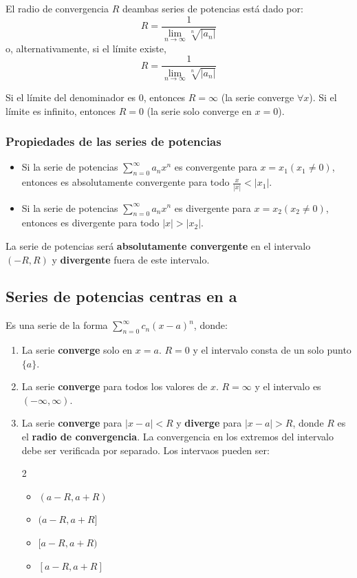 \documentclass[a4paper,12pt]{article}
\begin{document}
El radio de convergencia $R$ deambas series de potencias está dado por:
$$ R = \frac{1}{\lim_{n \to \infty} \sqrt[n]{|a_n|}} $$
o, alternativamente, si el límite existe,
$$ R = \frac{1}{\lim_{n \to \infty} \sqrt[n]{|a_n|}} $$

\begin{tcolorbox}
    Si el límite del denominador es 0, entonces $R = \infty$ (la serie converge $\forall x$). Si el límite es infinito, entonces $R = 0$ (la serie solo converge en $x = 0$).
\end{tcolorbox}

\subsubsection{Propiedades de las series de potencias}
\begin{itemize}
    \item Si la serie de potencias $\sum_{n=0}^{\infty} a_n x^n$ es convergente para $x = x_1 (x_1 \neq 0)$, entonces es absolutamente convergente para todo $\frac{x}{|x|} < |x_1|$.
    \item Si la serie de potencias $\sum_{n=0}^{\infty} a_n x^n$ es divergente para $x = x_2 (x_2 \neq 0)$, entonces es divergente para todo $|x| > |x_2|$.
\end{itemize}

\begin{tcolorbox}
    La serie de potencias será \textbf{absolutamente convergente} en el intervalo $(-R, R)$ y \textbf{divergente} fuera de este intervalo.
\end{tcolorbox}

\subsection{Series de potencias centras en a}

Es una serie de la forma $\sum_{n=0}^{\infty} c_n (x - a)^n$, donde:
\begin{enumerate}
    \item La serie \textbf{converge} solo en $x = a$. $R = 0$ y el intervalo consta de un solo punto $\{a\}$.
    \item La serie \textbf{converge} para todos los valores de $x$. $R = \infty$ y el intervalo es $(-\infty, \infty)$.
    \item La serie \textbf{converge} para $|x - a| < R$ y \textbf{diverge} para $|x - a| > R$, donde $R$ es el \textbf{radio de convergencia}. La convergencia en los extremos del intervalo debe ser verificada por separado. Los intervaos pueden ser: 
    \begin{multicols}{2}
        \begin{itemize}
            \item $(a-R, a+R)$
            \item $(a-R, a+R]$
            \item $[a-R, a+R)$
            \item $[a-R, a+R]$
        \end{itemize}
    \end{multicols}
\end{enumerate}
\end{document}
